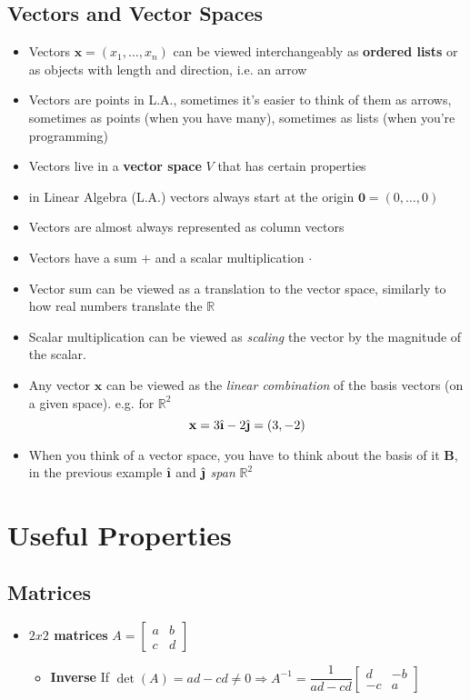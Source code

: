 \documentclass[pdftex,11pt,a4paper]{article}
\newcommand{\R}{\mathbb{R}}
\newcommand{\B}{\mathbf{B}}
\newcommand{\zero}{\mathbf{0}}
\newcommand{\ihat}{\hat{\textbf{\i}}}
\newcommand{\jhat}{\hat{\textbf{\j}}}
\newcommand{\xn}{\mathbf{x}}
\begin{document}
\subsection{Vectors and Vector Spaces}
\begin{itemize}
	\item Vectors $\xn = (x_1, \ldots, x_n)$ can be viewed interchangeably as \textbf{ordered lists} or as objects with length and direction, i.e. an arrow
	\item Vectors are points in L.A., sometimes it's easier to think of them as arrows, sometimes as points (when you have many), sometimes as lists (when you're programming)
	\item Vectors live in a \textbf{vector space} $V$ that has certain properties 
	\item in Linear Algebra (L.A.) vectors always start at the origin $\zero = (0,\ldots,0)$
	\item Vectors are almost always represented as column vectors
	\item Vectors have a sum $+$ and a scalar multiplication $\cdot$
	\item Vector sum can be viewed as a translation to the vector space, similarly to how real numbers translate the $\R$
	\item Scalar multiplication can be viewed as \textit{scaling} the vector by the magnitude of the scalar.
	\item Any vector $\xn$ can be viewed as the \textit{linear combination} of the basis vectors (on a given space). e.g. for $\R^2$
	$$\xn = 3\ihat -2\jhat = (3,-2)$$
	\item When you think of a vector space, you have to think about the basis of it $\B$, in the previous example $\ihat$ and $\jhat$ \textit{span} $\R^2$
	
\end{itemize}


\section{Useful Properties}
\subsection{Matrices}
\begin{itemize}
	\item \textbf{$2x2$ matrices}
	$A = \begin{bmatrix}
	a&b\\c&d
	\end{bmatrix} $
	\begin{itemize}
		\item \textbf{Inverse} If $\det(A) = ad -cd \neq 0 \Rightarrow A^{-1} = \dfrac{1}{ad-cd}	\begin{bmatrix}
			d & -b \\
			-c & a
		\end{bmatrix}$
	\end{itemize}
\end{itemize}
\end{document}
